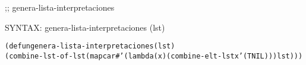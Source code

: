 \begin{aibox}{\function}
;; genera-lista-interpretaciones

SYNTAX: genera-lista-interpretaciones (lst) 
\end{aibox}

\begin{aibox}{\examples}
\begin{alltt}
\end{alltt}

\end{aibox}

\begin{aibox}{\comments}

\end{aibox}
\begin{aibox}{\answers}

\end{aibox}
\begin{aibox}{\othercomments}

\end{aibox}
\begin{aibox}{\pseudocode}

\end{aibox}
\begin{aibox}{\code}

\begin{alltt}

(defun genera-lista-interpretaciones (lst) 
    (combine-lst-of-lst (mapcar #'(lambda (x) (combine-elt-lst x '(T NIL))) lst)))

\end{alltt}
\end{aibox}
